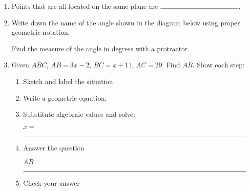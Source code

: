 \documentclass[12pt, twoside]{article}
\begin{document}
\begin{enumerate}
\item Points that are all located on the same plane are $\rule{4cm}{0.15mm}$.

\item Write down the name of the angle shown in the diagram below using proper geometric notation.
  \begin{center}
  \end{center}
  Find the measure of the angle in degrees with a protractor.

\newpage
\item Given $\overline{ABC}$, $AB=3x-2$, $BC=x+11$, $AC=29$. Find ${AB}$. Show each step:\\[0.35in]
    \begin{flushright}
    \end{flushright}
    \begin{enumerate}
      \item Sketch and label the situation
      \item Write a geometric equation:\\
      \item Substitute algebraic values and solve:
      \vspace{3cm}
      \begin{flushright} $x=$ \rule{1cm}{0.15mm} \end{flushright}
      \item Answer the question\\
      \begin{flushright} $AB=$ \rule{1cm}{0.15mm} \end{flushright}
      \item Check your answer
    \end{enumerate}


\end{enumerate}
\end{document}
